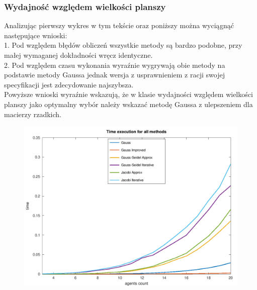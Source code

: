 \documentclass[10pt]{article}
\begin{document}
\subsubsection{Wydajność względem wielkości planszy}
Analizując pierwszy wykres w tym tekście oraz poniższy można wyciągnąć następujące wnioski:\\
1. Pod względem błędów obliczeń wszystkie metody są bardzo podobne, przy małej wymaganej dokładności wręcz identyczne.\\
2. Pod względem czasu wykonania wyraźnie wygrywają obie metody na podstawie metody Gaussa jednak wersja z usprawnieniem z racji swojej specyfikacji jest zdecydowanie najszybsza.
\\
Powyższe wnioski wyraźnie wskazują, że w klasie wydajności względem wielkości planszy jako optymalny wybór należy wskazać metodę Gaussa z ulepszeniem dla macierzy rzadkich.
\begin{figure}[h]
\centering
\includegraphics[scale=0.75]{plots/02_time_execution_all_methods.png}
\end{figure}
\newpage
\end{document}
